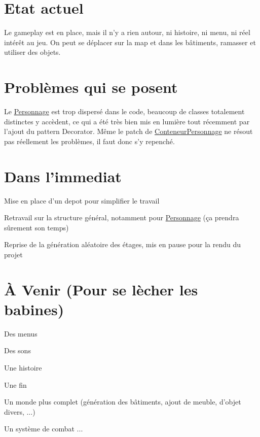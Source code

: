\hypertarget{index_actuel}{}\section{Etat actuel}\label{index_actuel}
Le gameplay est en place, mais il n'y a rien autour, ni histoire, ni menu, ni réel intérêt au jeu. On peut se déplacer sur la map et dans les bâtiments, ramasser et utiliser des objets.\hypertarget{index_probleme}{}\section{Problèmes qui se posent}\label{index_probleme}
Le \hyperlink{classPersonnage}{Personnage} est trop dispersé dans le code, beaucoup de classes totalement distinctes y accèdent, ce qui a été très bien mis en lumière tout récemment par l'ajout du pattern Decorator. Même le patch de \hyperlink{classConteneurPersonnage}{Conteneur\-Personnage} ne résout pas réellement les problèmes, il faut donc s'y repenché.\hypertarget{index_immediat}{}\section{Dans l'immediat}\label{index_immediat}

\begin{DoxyItemize}
\item Mise en place d'un depot pour simplifier le travail
\item Retravail sur la structure général, notamment pour \hyperlink{classPersonnage}{Personnage} (ça prendra sûrement son temps)
\item Reprise de la génération aléatoire des étages, mis en pause pour la rendu du projet
\end{DoxyItemize}\hypertarget{index_aVenir}{}\section{À Venir (\-Pour se lècher les babines)}\label{index_aVenir}

\begin{DoxyItemize}
\item Des menus
\item Des sons
\item Une histoire
\item Une fin
\item Un monde plus complet (génération des bâtiments, ajout de meuble, d'objet divers, ...)
\item Un système de combat ... 
\end{DoxyItemize}